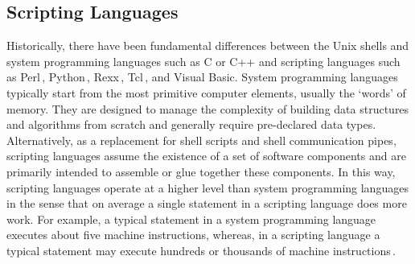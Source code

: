 \documentclass[10pt]{article}
\begin{document}
\subsection*{Scripting Languages}

Historically, there have been fundamental differences between the Unix
shells and system programming languages such as C or C++ and scripting
languages such as Perl\,\cite{wall99:_perl_progr_refer_guide},
Python\,\cite{martelli06:_python_nutsh},
Rexx\,\cite{ohara88:_moder_progr_using_rexx},
Tcl\,\cite{ousterhout94:_tcl_tk_toolk}, and Visual Basic.  System
programming languages typically start from the most primitive computer
elements, usually the `words' of memory. They are designed to manage
the complexity of building data structures and algorithms from scratch
and generally require pre-declared data types.  Alternatively, as a
replacement for shell scripts and shell communication pipes, scripting
languages assume the existence of a set of software components and are
primarily intended to assemble or glue together these components.
In this way, scripting languages operate at a higher level than system
programming languages in the sense that on average a single statement
in a scripting language does more work.  For example, a typical statement in a system
programming language executes about five machine instructions, whereas,
in a scripting language a typical statement may execute hundreds or thousands of machine instructions\,\cite{ousterhout98:_scrip}.


\end{document}
